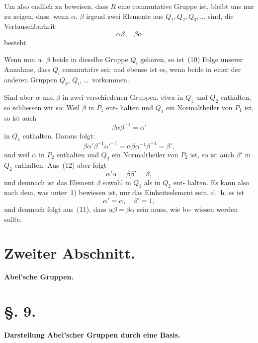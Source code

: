\documentclass[12pt,a4paper]{article}
\theoremstyle{plain}
\theoremstyle{definition}
\theoremstyle{remark}
\begin{document}
Um also endlich zu beweisen, dass $R$ eine commutative
Gruppe ist, bleibt uns nur zu zeigen, dass, wenn $\alpha$, $\beta$ irgend
zwei Elemente aus $Q_1, Q_2, Q_3, \ldots$ sind, die Vertauschbarkeit
\begin{equation}\tag{10}
\alpha\beta = \beta\alpha
\end{equation}
besteht.

Wenn nun $\alpha$, $\beta$ beide in dieselbe Gruppe $Q_i$ gehören, so
ist~(10) Folge unserer Annahme, dass $Q_i$ commutativ sei; und
ebenso ist es, wenn beide in einer der anderen Gruppen $Q_k$, $Q_l$, \ldots\ 
vorkommen.

Sind aber $\alpha$ und $\beta$ in zwei verschiedenen Gruppen, etwa in
$Q_1$ und $Q_2$ enthalten, so schliessen wir so: Weil $\beta$ in $P_1$ ent-
halten und $Q_1$ ein Normaltheiler von $P_1$ ist, so ist auch
\begin{equation}\tag{11}
\beta \alpha \beta^{-1} = \alpha'
\end{equation}
in $Q_1$ enthalten. Daraus folgt:
\begin{equation}\tag{12}
\beta \alpha' \beta^{-1} \alpha'^{-1} = \alpha \beta \alpha^{-1} \beta^{-1} = \beta',
\end{equation}
und weil $\alpha$ in $P_2$ enthalten und $Q_2$ ein Normaltheiler von $P_2$
ist, so ist auch $\beta'$ in $Q_2$ enthalten. Aus~(12) aber folgt
\[
\alpha' \alpha = \beta \beta' = \beta,
\]
und demnach ist das Element $\beta$ sowohl in $Q_1$ als in $Q_2$ ent-
halten. Es kann also nach dem, was unter~1) bewiesen ist, nur
das Einheitselement sein, d.~h. es ist
\[
\alpha' = \alpha, \quad \beta' = 1,
\]
und demnach folgt aus~(11), dass $\alpha\beta = \beta\alpha$ sein muss, wie be-
wiesen werden sollte.


\section*{Zweiter Abschnitt.}
\begin{center}
\Large\textbf{Abel'sche Gruppen.}
\end{center}

\section*{\S. 9.}
\begin{center}
\textbf{Darstellung Abel'scher Gruppen durch eine Basis.}
\end{center}
\end{document}
